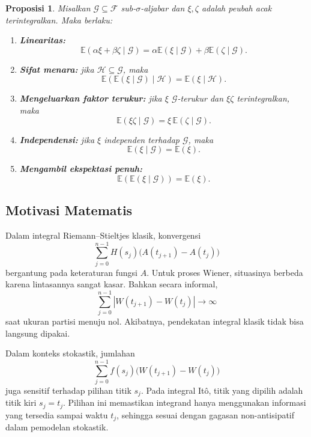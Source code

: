 \documentclass[12pt,a4paper]{article}
\theoremstyle{definition}
\theoremstyle{plain}
\newtheorem{proposisi}[definisi]{Proposisi}
\newcommand{\E}{\mathbb{E}}
\newcommand{\F}{\mathcal{F}}
\begin{document}
\begin{proposisi}
  Misalkan $\mathcal{G}\subseteq\F$ sub-$\sigma$-aljabar dan $\xi,\zeta$ adalah
  peubah acak terintegralkan. Maka berlaku:
  \begin{enumerate}[label=\arabic*.]
    \item \textbf{Linearitas:}
          \[
            \E(\alpha\xi+\beta\zeta\mid\mathcal{G})
            =
            \alpha\E(\xi\mid\mathcal{G})+\beta\E(\zeta\mid\mathcal{G}).
          \]
    \item \textbf{Sifat menara:} jika $\mathcal{H}\subseteq\mathcal{G}$, maka
          \[
            \E(\E(\xi\mid\mathcal{G})\mid\mathcal{H})=\E(\xi\mid\mathcal{H}).
          \]
    \item \textbf{Mengeluarkan faktor terukur:} jika $\xi$ $\mathcal{G}$-terukur
          dan $\xi\zeta$ terintegralkan, maka
          \[
            \E(\xi\zeta\mid\mathcal{G})=\xi\,\E(\zeta\mid\mathcal{G}).
          \]
    \item \textbf{Independensi:} jika $\xi$ independen terhadap $\mathcal{G}$,
          maka
          \[
            \E(\xi\mid\mathcal{G})=\E(\xi).
          \]
    \item \textbf{Mengambil ekspektasi penuh:}
          \[
            \E(\E(\xi\mid\mathcal{G}))=\E(\xi).
          \]
  \end{enumerate}
\end{proposisi}

\subsection{Motivasi Matematis}

Dalam integral Riemann--Stieltjes klasik, konvergensi
\[
  \sum_{j=0}^{n-1} H(s_j)\bigl(A(t_{j+1})-A(t_j)\bigr)
\]
bergantung pada keteraturan fungsi $A$. Untuk proses Wiener, situasinya
berbeda karena lintasannya sangat kasar. Bahkan secara informal,
\[
  \sum_{j=0}^{n-1}|W(t_{j+1})-W(t_j)|
  \longrightarrow \infty
\]
saat ukuran partisi menuju nol. Akibatnya, pendekatan integral klasik tidak
bisa langsung dipakai.

Dalam konteks stokastik, jumlahan
\[
  \sum_{j=0}^{n-1} f(s_j)\bigl(W(t_{j+1})-W(t_j)\bigr)
\]
juga sensitif terhadap pilihan titik $s_j$. Pada integral It\^o, titik yang
dipilih adalah titik kiri $s_j=t_j$. Pilihan ini memastikan integrand hanya
menggunakan informasi yang tersedia sampai waktu $t_j$, sehingga sesuai dengan
gagasan non-antisipatif dalam pemodelan stokastik.
\end{document}
